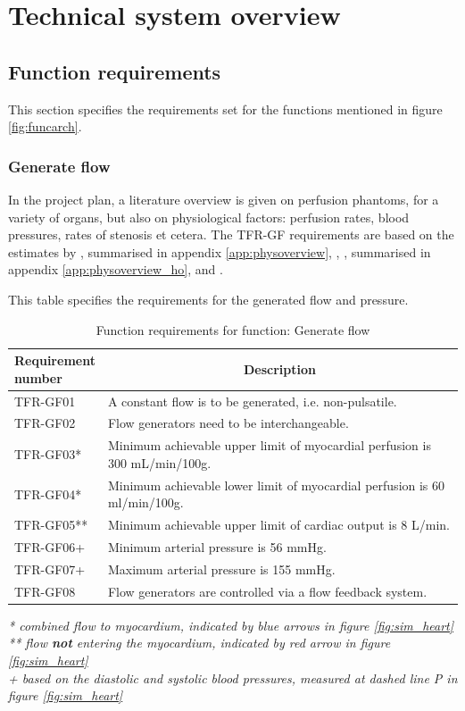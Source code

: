 \chapter{Technical system overview}

\section{Function requirements}
This section specifies the requirements set for the functions mentioned in figure \ref{fig:funcarch}.
\subsection{Generate flow}
In the project plan, a literature overview is given on perfusion phantoms, for a variety of organs, but also on physiological factors: perfusion rates, blood pressures, rates of stenosis et cetera. The TFR-GF requirements are based on the estimates by \cite{uren1994relation}, summarised in appendix \ref{app:physoverview}, \cite{chiribiri2013normal}, \cite{ho2014dynamic}, summarised in appendix \ref{app:physoverview_ho}, and \cite{slart2015pres}.

\begin{table} [H]
\caption{Function requirements for function: Generate flow}
\label{tab:funcreq_tec}
This table specifies the requirements for the generated flow and pressure.
\begin{tabular}{l|p{120mm}|}
	\makecell[l]{\textbf{Requirement} \\  \textbf{number}} & \multicolumn{1}{c}{\textbf{Description}}\\
	\hline
	TFR-GF01 & A constant flow is to be generated, i.e. non-pulsatile. \\
	TFR-GF02 & Flow generators need to be interchangeable. \\
	TFR-GF03* & Minimum achievable upper limit of myocardial perfusion is 300 mL/min/100g. \\
	TFR-GF04* & Minimum achievable lower limit of myocardial perfusion is 60 ml/min/100g. \\
	TFR-GF05** & Minimum achievable upper limit of cardiac output is 8 L/min.\\
	TFR-GF06+ & Minimum arterial pressure is 56 mmHg. \\
	TFR-GF07+ & Maximum arterial pressure is  155 mmHg. \\
	TFR-GF08 & Flow generators are controlled via a flow feedback system. \\
	\cline{2-2}
\end{tabular}
\raggedright
\textit{* combined flow to myocardium, indicated by blue arrows in figure \ref{fig:sim_heart} }\\
\textit{** flow \textbf{not} entering the myocardium, indicated by red arrow in figure \ref{fig:sim_heart}} \\
\textit{+ based on the diastolic and systolic blood pressures, measured at dashed line P in figure \ref{fig:sim_heart}} \\
\end{table}

